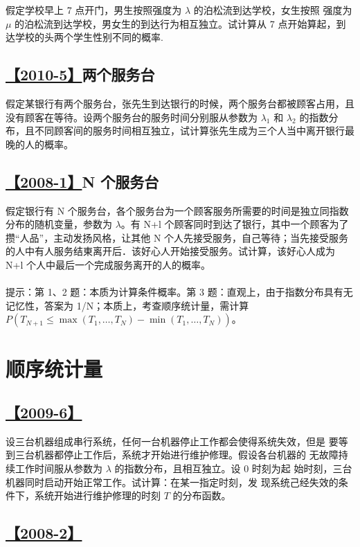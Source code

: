 假定学校早上 7 点开门，男生按照强度为 $\lambda$ 的泊松流到达学校，女生按照
强度为 $\mu$ 的泊松流到达学校，男女生的到达行为相互独立。试计算从 7 点开始算起，到达学校的头两个学生性别不同的概率.

\subsection{\hyperref[A2010-5]{【2010-5】}两个服务台}\label{Q2010-5}

假定某银行有两个服务台，张先生到达银行的时候，两个服务台都被顾客占用，且没有顾客在等待。设两个服务台的服务时间分别服从参数为 $\lambda_1$ 和 $\lambda_2$ 的指数分布，且不同顾客间的服务时间相互独立，试计算张先生成为三个人当中离开银行最晚的人的概率。

\subsection{\hyperref[A2008-1]{【2008-1】}N 个服务台}\label{Q2008-1}

假定银行有 N 个服务台，各个服务台为一个顾客服务所需要的时间是独立同指数分布的随机变量，参数为 $\lambda$。有 N+l 个顾客同时到达了银行，其中一个顾客为了攒“人品”，主动发扬风格，让其他 N 个人先接受服务，自己等待；当先接受服务的人中有人服务结東离开后．该好心人开始接受服务。试计算，该好心人成为 N+l 个人中最后一个完成服务离开的人的概率。
\\\\
提示：第 1、2 题：本质为计算条件概率。第 3 题：直观上，由于指数分布具有无记忆性，答案为 1/N；本质上，考查顺序统计量，需计算 $P(T_{N+1}\le \max(T_1,\dots,T_N)- \min(T_1,\dots,T_N))$。

\section{顺序统计量}

\subsection{\hyperref[A2009-6]{【2009-6】}}\label{Q2009-6}

设三台机器组成串行系统，任何一台机器停止工作都会使得系统失效，但是
要等到三台机器都停止工作后，系统才开始进行维护修理。假设各台机器的
无故障持续工作时间服从参数为 $\lambda$ 的指数分布，且相互独立。设 0 时刻为起
始时刻，三台机器同时启动开始正常工作。试计算：在某一指定时刻，发
现系统己经失效的条件下，系统开始进行维护修理的时刻 $T$ 的分布函数。

\subsection{\hyperref[A2008-2]{【2008-2】}}\label{Q2008-2}

